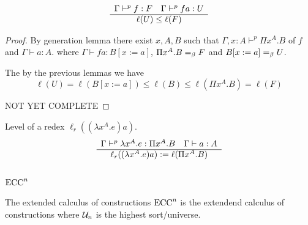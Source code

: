 \begin{lemma}
  $$
  \begin{array}{c} \Gamma \vdash^p f : F
    \quad
    \Gamma \vdash^p f a : U
   \\ \hline \ell(U) \le \ell(F)\end{array}
  $$
  \begin{proof}
    By generation lemma there exist $x,A,B$ such that
    $\Gamma,x:A \vdash^p \Pi x^A.B$ of $f$
    and
    $\Gamma \vdash a:A$.  where $\Gamma \vdash f a : B[x:=a]$,
    $\Pi x^A.B =_\beta F$ and $B[x:=a] =_\beta U$.

    The by the previous lemmas we have
    $$
    \ell(U) = \ell(B[x:=a]) \le \ell(B) \le \ell(\Pi x^A.B) = \ell(F)
    $$

    NOT YET COMPLETE
  \end{proof}
\end{lemma}


\begin{definition}
  Level of a redex $\ell_r((\lambda x^A.e) a)$.
  $$
  \begin{array}{c} \Gamma \vdash^p \lambda x^A.e : \Pi x^A.B
    \quad
    \Gamma \vdash a: A
     \\ \hline \ell_r((\lambda x^A.e) a) := \ell(\Pi x^A.B)\end{array}
  $$
\end{definition}



\subsection{$\text{ECC}^n$}

\begin{definition}
The extended calculus of constructions $\text{ECC}^n$ is the extendend calculus of
constructions where ${\cal U}_n$ is the highest sort/universe.
\end{definition}

